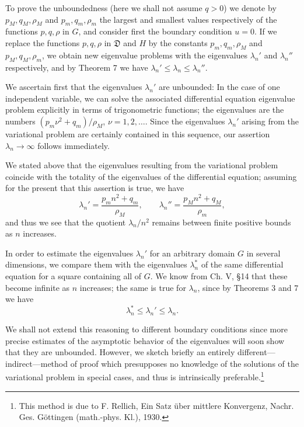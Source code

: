To prove the unboundedness (here we shall not assume $q>0$) we denote by $p_M,q_M,\rho_M$ and $p_m,q_m,\rho_m$ the largest and smallest values respectively of the functions $p,q,\rho$ in $G$, and consider first the boundary condition $u=0$. If we replace the functions $p,q,\rho$ in $\mathfrak D$ and $H$ by the constants $p_m,q_m,\rho_M$ and $p_M,q_M,\rho_m$, we obtain new eigenvalue problems with the eigenvalues $\lambda_n'$ and $\lambda_n''$ respectively, and by Theorem 7 we have $\lambda_n'\le\lambda_n\le\lambda_n''$.

We ascertain first that the eigenvalues $\lambda_n'$ are unbounded: In the case of one independent variable, we can solve the associated differential equation eigenvalue problem explicitly in terms of trigonometric functions; the eigenvalues are the numbers $(p_m \nu^2+q_m)/\rho_M$, $\nu=1,2,\ldots$. Since the eigenvalues $\lambda_n'$ arising from the variational problem are certainly contained in this sequence, our assertion $\lambda_n\to\infty$ follows immediately.

We stated above that the eigenvalues resulting from the variational problem coincide with the totality of the eigenvalues of the differential equation; assuming for the present that this assertion is true, we have
\[
\lambda_n'=\frac{p_mn^2+q_m}{\rho_M},\qquad
\lambda_n''=\frac{p_Mn^2+q_M}{\rho_m},
\]
and thus we see that the quotient $\lambda_n/n^2$ remains between finite positive bounds as $n$ increases.

In order to estimate the eigenvalues $\lambda_n'$ for an arbitrary domain $G$ in several dimensions, we compare them with the eigenvalues $\lambda_n^*$ of the same differential equation for a square containing all of $G$. We know from Ch. V, \S14 that these become infinite as $n$ increases; the same is true for $\lambda_n$, since by Theorems 3 and 7 we have
\[
\lambda_n^*\le\lambda_n'\le\lambda_n.
\]

We shall not extend this reasoning to different boundary conditions since more precise estimates of the asymptotic behavior of the eigenvalues will soon show that they are unbounded. However, we sketch briefly an entirely different---indirect---method of proof which presupposes no knowledge of the solutions of the variational problem in special cases, and thus is intrinsically preferable.\footnote{This method is due to F. Rellich, Ein Satz \"uber mittlere Konvergenz, Nachr. Ges. G\"ottingen (math.-phys. Kl.), 1930.}

